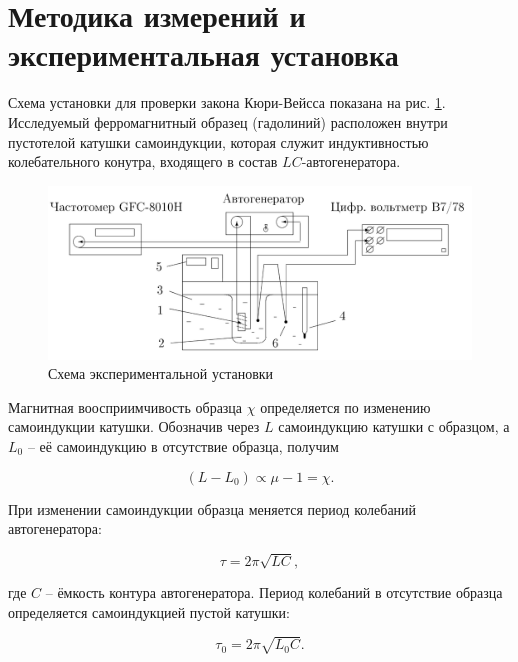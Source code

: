 \documentclass[a4paper, 12pt]{article}
\begin{document}
    \section{Методика измерений и экспериментальная установка}
    
    Схема установки для проверки закона Кюри-Вейсса показана на рис. \ref{installation}. Исследуемый ферромагнитный образец (гадолиний) расположен внутри пустотелой катушки самоиндукции, которая служит индуктивностью колебательного конутра, входящего в состав $LC$-автогенератора.

    \begin{figure}[H]
        \centering
        \includegraphics[width = 14 cm]{images/installation.png}
        \caption{Схема экспериментальной установки}
        \label{installation}
    \end{figure}
	
    Магнитная воосприимчивость образца $\chi$ определяется по изменению самоиндукции катушки. Обозначив через $L$ самоиндукцию катушки с образцом, а $L_0$ -- её самоиндукцию в отсутствие образца, получим
    
    \begin{equation}
        (L - L_0) \propto \mu - 1 = \chi.
    \end{equation}
    
    При изменении самоиндукции образца меняется период колебаний автогенератора:
    
    \begin{equation}
        \tau = 2\pi \sqrt{LC},
    \end{equation}
    
    где $C$ -- ёмкость контура автогенератора. Период колебаний в отсутствие образца определяется самоиндукцией пустой катушки:
    
    \begin{equation}
        \tau_0 = 2\pi \sqrt{L_0C}.
    \end{equation}
\end{document}
